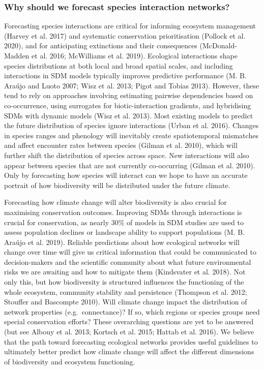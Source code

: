 \documentclass[11pt]{article}
\begin{document}
\hypertarget{why-should-we-forecast-species-interaction-networks}{%
\subsubsection{Why should we forecast species interaction
networks?}\label{why-should-we-forecast-species-interaction-networks}}

Forecasting species interactions are critical for informing ecosystem
management (Harvey et al. 2017) and systematic conservation
prioritisation (Pollock et al. 2020), and for anticipating extinctions
and their consequences (McDonald-Madden et al. 2016; McWilliams et al.
2019). Ecological interactions shape species distributions at both local
and broad spatial scales, and including interactions in SDM models
typically improves predictive performance (M. B. Araújo and Luoto 2007;
Wisz et al. 2013; Pigot and Tobias 2013). However, these tend to rely on
approaches involving estimating pairwise dependencies based on
co-occurrence, using surrogates for biotic-interaction gradients, and
hybridising SDMs with dynamic models (Wisz et al. 2013). Most existing
models to predict the future distribution of species ignore interactions
(Urban et al. 2016). Changes in species ranges and phenology will
inevitably create spatiotemporal mismatches and affect encounter rates
between species (Gilman et al. 2010), which will further shift the
distribution of species across space. New interactions will also appear
between species that are not currently co-occurring (Gilman et al.
2010). Only by forecasting how species will interact can we hope to have
an accurate portrait of how biodiversity will be distributed under the
future climate.

Forecasting how climate change will alter biodiversity is also crucial
for maximising conservation outcomes. Improving SDMs through
interactions is crucial for conservation, as nearly 30\% of models in
SDM studies are used to assess population declines or landscape ability
to support populations (M. B. Araújo et al. 2019). Reliable predictions
about how ecological networks will change over time will give us
critical information that could be communicated to decision-makers and
the scientific community about what future environmental risks we are
awaiting and how to mitigate them (Kindsvater et al. 2018). Not only
this, but how biodiversity is structured influences the functioning of
the whole ecosystem, community stability and persistence (Thompson et
al. 2012; Stouffer and Bascompte 2010). Will climate change impact the
distribution of network properties (e.g.~connectance)? If so, which
regions or species groups need special conservation efforts? These
overarching questions are yet to be answered (but see Albouy et al.
2013; Kortsch et al. 2015; Hattab et al. 2016). We believe that the path
toward forecasting ecological networks provides useful guidelines to
ultimately better predict how climate change will affect the different
dimensions of biodiversity and ecosystem functioning.
\end{document}
